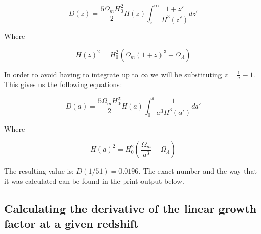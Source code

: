 \documentclass[a4paper,10pt]{article}
\begin{document}
\begin{equation}
D(z) = \frac{5\Omega_mH_0^2}{2}H(z)\int_z^\infty\frac{1+z'}{H^3(z')}dz'
\end{equation}

Where 

\begin{equation}
H(z)^2 = H^2_0(\Omega_m(1+z)^3+\Omega_\Lambda)
\end{equation}

In order to avoid having to integrate up to $\infty$ we will be substituting $z = \frac{1}{a} -1$. This gives us the following equations:

\begin{equation}
D(a) = \frac{5\Omega_mH_0^2}{2}H(a)\int_0^a\frac{1}{a^3H^3(a')}da'
\end{equation}

Where 

\begin{equation}
H(a)^2 = H^2_0(\frac{\Omega_m}{a^3}+\Omega_\Lambda)
\end{equation}

The resulting value is: $D(1/51) = 0.0196$. The exact number and the way that it was calculated can be found in the print output below. 

\subsection{Calculating the derivative of the linear growth factor at a given redshift}
\end{document}
